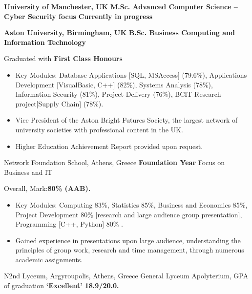 {\textbf{University of Manchester, UK}}
{\textbf{M.Sc. Advanced Computer Science -- Cyber Security focus}}
{\textbf{Currently in progress} }

{\textbf{Aston University, Birmingham, UK}}
{\textbf{B.Sc. Business Computing and Information Technology}}
{
    Graduated with \textbf{First Class Honours }
    \begin{itemize}
        \item Key Modules: Database Applications [SQL, MSAccess] (79.6\%), Applications Development [VisualBasic, C++] (82\%), Systems Analysis (78\%), Information Security (81\%), Project Delivery (76\%), BCIT Research project[Supply Chain]  (78\%).
        \item Vice President of the Aston Bright Futures Society, the largest network of university societies with professional content in the UK.
        \item Higher Education Achievement Report provided upon request.
    \end{itemize}
}

{Network Foundation School, Athens, Greece}
{\textbf{Foundation Year} Focus on Business and IT}
{
    Overall, Mark:\textbf{80\% (AAB).}
    \begin{itemize}
        \item Key Modules: Computing 83\%, Statistics 85\%, Business and Economics 85\%, Project Development 80\% [research and large audience group presentation], Programming [C++, Python] 80\% .
        \item Gained experience in presentations upon large audience, understanding the principles of group work, research and time management, through numerous academic assignments.
    \end{itemize}
}

{}
{N2nd Lyceum, Argyroupolis, Athens, Greece}
{General Lyceum Apolyterium, GPA of graduation \textbf{‘Excellent’ 18.9/20.0.}}
